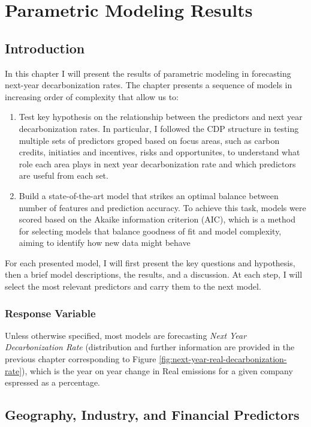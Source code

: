 \chapter{Parametric Modeling Results}
\label{chap:chapter4}

\section{Introduction}
In this chapter I will present the results of parametric modeling in forecasting next-year decarbonization rates. The chapter presents a sequence of models in increasing order of complexity that allow us to:
\begin{enumerate}
    \item Test key hypothesis on the relationship between the predictors and next year decarbonization rates. In particular, I followed the CDP structure in testing multiple sets of predictors groped based on focus areas, such as carbon credits, initiaties and incentives, risks and opportunites, to understand what role each area plays in next year decarbonization rate and which predictors are useful from each set. 
    \item Build a state-of-the-art model that strikes an optimal balance between number of features and prediction accuracy. To achieve this task, models were scored based on the Akaike information criterion (AIC), which is a method for selecting models that balance goodness of fit and model complexity, aiming to identify how new data might behave \cite{AIC}
\end{enumerate}
For each presented model, I will first present the key questions and hypothesis, then a brief model descriptions, the results, and a discussion. At each step, I will select the most relevant predictors and carry them to the next model. 

\subsection{Response Variable}
\noindent Unless otherwise specified, most models are forecasting \textit{Next Year Decarbonization Rate} (distribution and further information are provided in the previous chapter corresponding to Figure \ref{fig:next-year-real-decarbonization-rate}), which is the year on year change in Real emissions for a given company espressed as a percentage. 

\section{Geography, Industry, and Financial Predictors}

